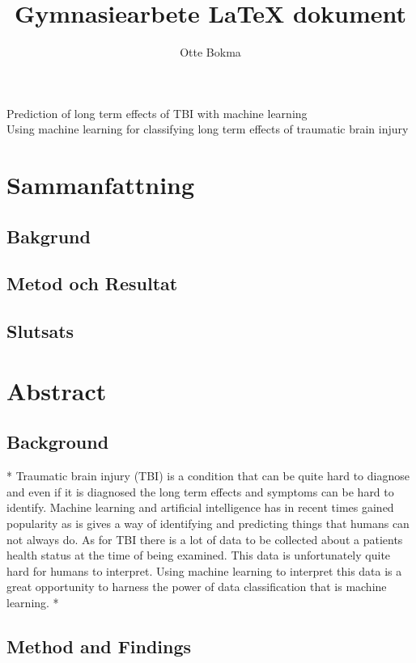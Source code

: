 \documentclass[11pt]{article}
\title{Gymnasiearbete {\LaTeX} dokument}
\author{Otte Bokma}
\begin{document}
\begin{titlepage}

  \begin{center}
    \huge{Prediction of long term effects of TBI with machine learning}
    \\[1cm]
    \large{Using machine learning for classifying long term effects of traumatic brain injury}
  \end{center}
\end{titlepage}

\section*{Sammanfattning}

\subsection*{Bakgrund}

\subsection*{Metod och Resultat}

\subsection*{Slutsats}

\section*{Abstract}

\subsection*{Background}

*
Traumatic brain injury (TBI) is a condition that can be quite hard to diagnose and even if it is diagnosed the long term effects and symptoms can be hard to identify. Machine learning and artificial intelligence has in recent times gained popularity as is gives a way of identifying and predicting things that humans can not always do. As for TBI there is a lot of data to be collected about a patients health status at the time of being examined. This data is unfortunately quite hard for humans to interpret. Using machine learning to interpret this data is a great opportunity to harness the power of data classification that is machine learning.
*

\subsection*{Method and Findings}
\end{document}
